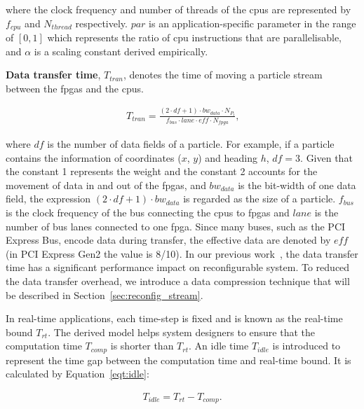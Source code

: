 where the clock frequency and number of threads of the \glspl{cpu} are represented by $f_{cpu}$ and $N_{thread}$ respectively.
$par$ is an application-specific parameter in the range of $[0,1]$ which represents the ratio of \gls{cpu} instructions that are parallelisable, and $\alpha$ is a scaling constant derived empirically.

\textbf{Data transfer time}, $T_{tran}$, denotes the time of moving a particle stream between the \glspl{fpga} and the \glspl{cpu}.

\begin{equation}
\begin{aligned}
T_{tran} = \frac{(2 \cdot df + 1) \cdot bw_{data} \cdot {N_{P_t}}}{f_{bus} \cdot lane \cdot eff \cdot N_{fpga}} \mbox{,}
\end{aligned}
\label{eqt:data}
\end{equation}

where $df$ is the number of data fields of a particle.
For example, if a particle contains the information of coordinates ($x$, $y$) and heading $h$, $df=3$.
Given that the constant 1 represents the weight and the constant 2 accounts for the movement of data in and out of the \glspl{fpga},
and $bw_{data}$ is the bit-width of one data field, the expression $(2 \cdot df + 1) \cdot bw_{data}$ is regarded as the size of a particle.
$f_{bus}$ is the clock frequency of the bus connecting the \glspl{cpu} to \glspl{fpga} and $lane$ is the number of bus lanes connected to one \gls{fpga}.
Since many buses, such as the PCI Express Bus, encode data during transfer, the effective data are denoted by $eff$ (in PCI Express Gen2 the value is 8/10).
In our previous work~\cite{chau13arc}, the data transfer time has a significant performance impact on reconfigurable system.
To reduced the data transfer overhead, we introduce a data compression technique that will be described in Section~\ref{sec:reconfig_stream}.

In real-time applications, each time-step is fixed and is known as the real-time bound $T_{rt}$.
The derived model helps system designers to ensure that the computation time $T_{comp}$ is shorter than $T_{rt}$.
An idle time $T_{idle}$ is introduced to represent the time gap between the computation time and real-time bound.
It is calculated by Equation~\ref{eqt:idle}:

\begin{equation}
\begin{aligned}
T_{idle} = T_{rt} - T_{comp} \mbox{.}
\end{aligned}
\label{eqt:idle}
\end{equation}

